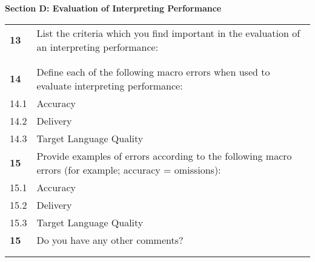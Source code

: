 \documentclass[output=paper]{langsci/langscibook}
\begin{document}
{\newpage
\textbf{Section D: Evaluation of Interpreting Performance}
\begin{center}
\begin{tabularx}{\textwidth}{Xp{}}
\rowcolor{lsLightGray} \textbf{13} & List the criteria which you find important in the evaluation of an interpreting performance: \\
  & \\
  & \\
\rowcolor{lsLightGray} \textbf{14} & Define each of the following macro errors when used to evaluate interpreting performance: \\
14.1 & Accuracy \\
14.2 & Delivery \\
14.3 & Target Language Quality \\
\rowcolor{lsLightGray} \textbf{15} & Provide examples of errors according to the following macro errors (for example; accuracy = omissions):\\
15.1 & Accuracy \\
15.2 & Delivery \\
15.3 & Target Language Quality \\
\rowcolor{lsLightGray} \textbf{15} & Do you have any other comments?\\
& \\
& \\
\end{tabularx}   
\end{center}
}
\end{document}
